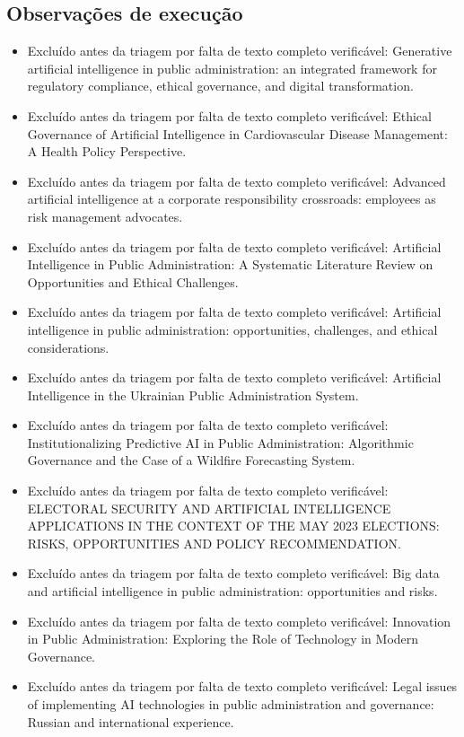 \documentclass[12pt,a4paper]{article}
\begin{document}
\subsection{Observações de execução}
\label{sec:org4363205}

\begin{itemize}
\item Excluído antes da triagem por falta de texto completo verificável: Generative artificial intelligence in public administration: an integrated framework for regulatory compliance, ethical governance, and digital transformation.
\item Excluído antes da triagem por falta de texto completo verificável: Ethical Governance of Artificial Intelligence in Cardiovascular Disease Management: A Health Policy Perspective.
\item Excluído antes da triagem por falta de texto completo verificável: Advanced artificial intelligence at a corporate responsibility crossroads: employees as risk management advocates.
\item Excluído antes da triagem por falta de texto completo verificável: Artificial Intelligence in Public Administration: A Systematic Literature Review on Opportunities and Ethical Challenges.
\item Excluído antes da triagem por falta de texto completo verificável: Artificial intelligence in public administration: opportunities, challenges, and ethical considerations.
\item Excluído antes da triagem por falta de texto completo verificável: Artificial Intelligence in the Ukrainian Public Administration System.
\item Excluído antes da triagem por falta de texto completo verificável: Institutionalizing Predictive AI in Public Administration: Algorithmic Governance and the Case of a Wildfire Forecasting System.
\item Excluído antes da triagem por falta de texto completo verificável: ELECTORAL SECURITY AND ARTIFICIAL INTELLIGENCE APPLICATIONS IN THE CONTEXT OF THE MAY 2023 ELECTIONS: RISKS, OPPORTUNITIES AND POLICY RECOMMENDATION.
\item Excluído antes da triagem por falta de texto completo verificável: Big data and artificial intelligence in public administration: opportunities and risks.
\item Excluído antes da triagem por falta de texto completo verificável: Innovation in Public Administration: Exploring the Role of Technology in Modern Governance.
\item Excluído antes da triagem por falta de texto completo verificável: Legal issues of implementing AI technologies in public administration and governance: Russian and international experience.

\end{itemize}
\end{document}
